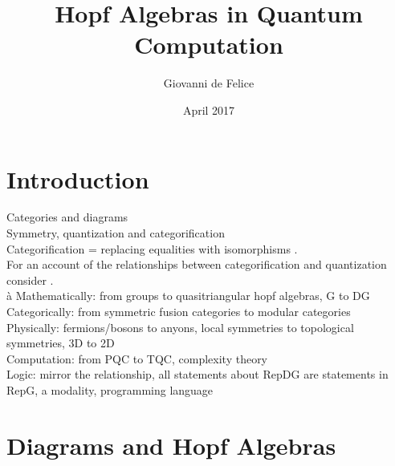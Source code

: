 \documentclass{article}
\title{Hopf Algebras in Quantum Computation}
\author{Giovanni de Felice}
\date{April 2017}
\begin{document}
\maketitle
\tableofcontents

\pagebreak
\section{Introduction}
Categories and diagrams \\
Symmetry, quantization and categorification \\
Categorification = replacing equalities with isomorphisms \cite{Baez98}.\\
For an account of the relationships between categorification and quantization consider \cite{Rowell17}.\\à 
Mathematically: from groups to quasitriangular hopf algebras, G to DG\\
Categorically: from symmetric fusion categories to modular categories\\
Physically: fermions/bosons to anyons, local symmetries to topological symmetries, 3D to 2D\\
Computation: from PQC to TQC, complexity theory\\
Logic: mirror the relationship, all statements about RepDG are statements in RepG, a modality, programming language

\section{Diagrams and Hopf Algebras}
\end{document}
